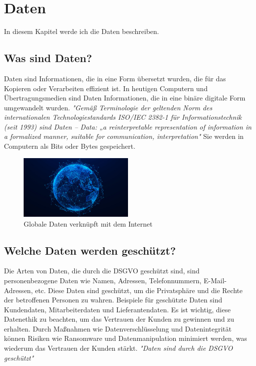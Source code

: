 \chapter{Daten}
\label{chap:data}

In diesem Kapitel werde ich die Daten beschreiben.

\section{Was sind Daten?}

Daten sind Informationen, die in eine Form übersetzt wurden, die für das Kopieren oder Verarbeiten effizient ist. In heutigen Computern und Übertragungsmedien sind Daten Informationen, die in eine binäre digitale Form umgewandelt wurden. \textit{"Gemäß Terminologie der geltenden Norm des internationalen Technologiestandards ISO/IEC 2382-1 für Informationstechnik (seit 1993) sind Daten – Data: „a reinterpretable representation of information in a formalized manner, suitable for communication, interpretation" \citep{data-wikipedia}} Sie werden in Computern als Bits oder Bytes gespeichert. 

\begin{figure}[h]
    \centering
    \includegraphics[width=0.5\textwidth]{data.jpg}
    \caption{Globale Daten verknüpft mit dem Internet}
    \label{fig:data}
\end{figure}

\section{Welche Daten werden geschützt?}

Die Arten von Daten, die durch die DSGVO geschützt sind, sind personenbezogene Daten wie Namen, Adressen, Telefonnummern, E-Mail-Adressen, etc. Diese Daten sind geschützt, um die Privatsphäre und die Rechte der betroffenen Personen zu wahren. Beispiele für geschützte Daten sind Kundendaten, Mitarbeiterdaten und Lieferantendaten. Es ist wichtig, diese Datenethik zu beachten, um das Vertrauen der Kunden zu gewinnen und zu erhalten. Durch Maßnahmen wie Datenverschlüsselung und Datenintegrität können Risiken wie Ransomware und Datenmanipulation minimiert werden, was wiederum das Vertrauen der Kunden stärkt. \textit{"Daten sind durch die DSGVO geschützt" }

